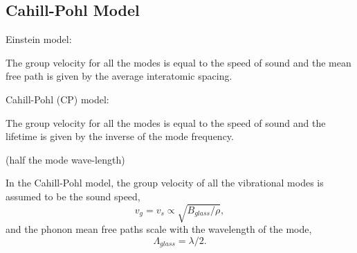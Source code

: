 \documentclass[aps,prb,preprint,superscriptaddress,amsmath,amssymb,floatfix]{revtex4}
\begin{document}


\subsection{\label{S:Lifetimes:}Cahill-Pohl Model}
Einstein model:

The group velocity for all the modes is equal to the speed of sound and the 
mean free path is given by the average interatomic spacing.
\cite{kittel_interpretation_1949,cahill_lower_1992}

Cahill-Pohl (CP) model:

The group velocity for all the modes is equal to the speed of sound and 
the lifetime is given by the inverse of the mode frequency.
\cite{cahill_lower_1992}

(half the mode 
wave-length)

In the Cahill-Pohl model,
\cite{PhysRevB.46.6131} the group velocity of all the vibrational modes is 
assumed to be the sound speed,
\begin{equation}\label{E-Seq}
v_g = v_s \propto \sqrt{B_{glass}/\rho},
\end{equation}
and the phonon mean free paths scale with the wavelength of the mode,
\begin{equation}\label{EQ:M:l_glass}
\Lambda_{glass} = \lambda /2.
\end{equation}
\end{document}
